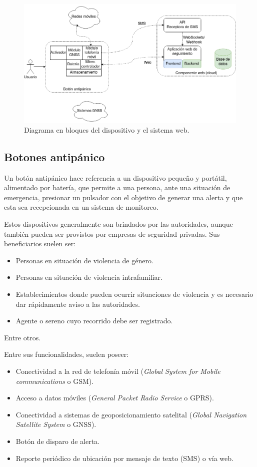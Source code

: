 \begin{figure}[htbp]
	\centering
	\includegraphics[width=.9\textwidth]{./Figures/diagBloques.png}
	\caption{Diagrama en bloques del dispositivo y el sistema web.}
	\label{fig:texmaker}
\end{figure}

\subsection{Botones antipánico}

Un botón antipánico hace referencia a un dispositivo pequeño y portátil, alimentado por batería, que permite a una persona, ante una situación de emergencia, presionar un pulsador con el objetivo de generar una alerta y que esta sea recepcionada en un sistema de monitoreo.

Estos dispositivos generalmente son brindados por las autoridades, aunque también pueden ser provistos por empresas de seguridad privadas. Sus beneficiarios suelen ser:
\begin{itemize}
\item Personas en situación de violencia de género.	
\item Personas en situación de violencia intrafamiliar.
\item Establecimientos donde pueden ocurrir situaciones de violencia y es necesario dar rápidamente aviso a las autoridades.
\item Agente o sereno cuyo recorrido debe ser registrado.
\end{itemize}
Entre otros.

Entre sus funcionalidades, suelen poseer:
\begin{itemize}
\item Conectividad a la red de telefonía móvil (\textit{Global System for Mobile communications} o GSM).
\item Acceso a datos móviles (\textit{General Packet Radio Service} o GPRS).
\item Conectividad a sistemas de geoposicionamiento satelital (\textit{Global Navigation Satellite System} o GNSS).
\item Botón de disparo de alerta.
\item Reporte periódico de ubicación por mensaje de texto (SMS) o vía web.
\end{itemize}

